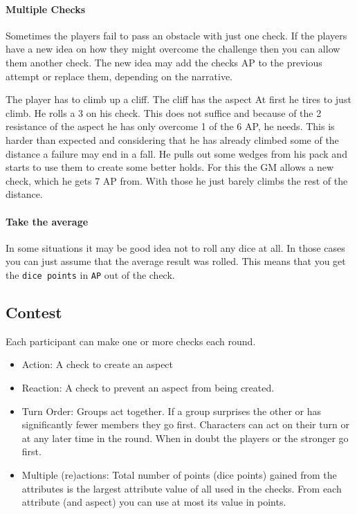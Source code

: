 \documentclass[11pt]{article}
\begin{document}
{\paragraph*{Multiple Checks}
\label{sec:orgcfb1d93}
Sometimes the players fail to pass an obstacle with just one check. If the players have a new idea on how they might overcome the challenge then you can allow them another check. The new idea may add the checks AP to the previous attempt or replace them, depending on the narrative.

\begin{pwexample}
The player has to climb up a cliff. The cliff has the aspect  At first he tires to just climb. He rolls a 3 on his check. This does not suffice and because of the 2 resistance of the aspect he has only overcome 1 of the 6 AP, he needs. This is harder than expected and considering that he has already climbed some of the distance a failure may end in a fall. He pulls out some wedges from his pack and starts to use them to create some better holds. For this the GM allows a new check, which he gets 7 AP from. With those he just barely climbs the rest of the distance.
\end{pwexample}
\paragraph*{Take the average}
\label{sec:org46b7c22}
In some situations it may be good idea not to roll any dice at all. In those cases you can just assume that the average result was rolled. This means that you get the \texttt{dice points} in \texttt{AP} out of the check. 
\subsection{Contest}
\label{sec:org5bd57ed}
\begin{short}
Each participant can make one or more checks each round.
\begin{itemize}
\item Action: A check to create an aspect
\item Reaction: A check to prevent an aspect from being created.
\item Turn Order: Groups act together. If a group surprises the other or has significantly fewer members they go first. Characters can act on their turn or at any later time in the round. When in doubt the players or the stronger go first.
\item Multiple (re)actions: Total number of points (dice points) gained from the attributes is the largest attribute value of all used in the checks. From each attribute (and aspect) you can use at most its value in points.
\end{itemize}
\end{short}

}
\end{document}

